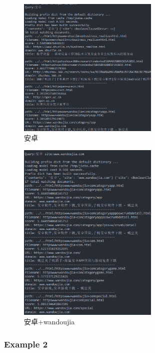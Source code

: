 \documentclass[12pt,a4paper]{article}
\begin{document}
\begin{figure}[H]
	\includegraphics[width=0.6\textwidth]{q00.png}
	\centering
	 \caption{安卓}
\end{figure}
\begin{figure}[H]
	\includegraphics[width=0.6\textwidth]{q01.png}
	\centering
	 \caption{安卓+wandoujia}
\end{figure}

\subsubsection{Example 2}
\end{document}
